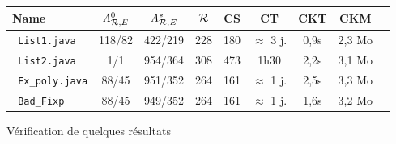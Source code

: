 \begin{figure}[ht!]
  \centering
  \begin{tabular}{l|c|c|c|c|c|c|c|c}
    Name & ${\mathit A}_{\mathcal R,E}^0$ & ${\mathit A}_{\mathcal R,E}^*$ & $\mathcal R$ & CS & CT & CKT & CKM \\ \hline
    
    \texttt{ List1.java} & 118/82 & 422/219 & 228 & 180 & $\approx$ 3 j. & 0,9s & 2,3 Mo \\ \hline
    \texttt{ List2.java} & 1/1 & 954/364 & 308 & 473 & 1h30 & 2,2s & 3,1 Mo \\ \hline
    \texttt{ Ex\_poly.java} & 88/45 & 951/352 & 264 & 161 & $\approx$ 1 j. & 2,5s & 3,3 Mo \\ \hline
    \texttt{ Bad\_Fixp} & 88/45 & 949/352 & 264 & 161 & $\approx$ 1 j. & 1,6s & 3,2 Mo \\ \hline
  \end{tabular}
  \caption{Vérification de quelques résultats}
  \label{tab:benchs}
\end{figure}


